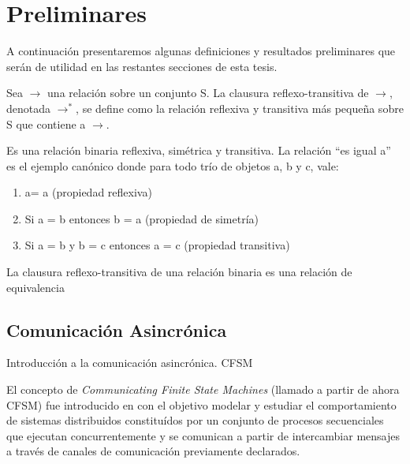 \section{Preliminares}
\label{preliminares}
A continuación presentaremos algunas definiciones y resultados preliminares que serán de utilidad en las restantes secciones de esta tesis.

\begin{definition} Sea $\rightarrow$ una relación sobre un conjunto S. La clausura reflexo-transitiva de $\rightarrow$, denotada  $\rightarrow^*$, se define como la relación reflexiva y transitiva más pequeña sobre S que contiene a $\rightarrow$. 
\end{definition} 
\begin{definition} Es una relación binaria reflexiva, simétrica y transitiva. La relación ``es igual a''  es el ejemplo canónico donde para todo trío de objetos a, b y c, vale: 

\begin{enumerate}
    \item a= a (propiedad reflexiva)
    \item Si a = b entonces b = a (propiedad de simetría)
    \item Si a = b y b = c entonces a = c (propiedad transitiva)
\end{enumerate}
\end{definition}

\begin{prop}
 La clausura reflexo-transitiva de una relación binaria es una relación de equivalencia
\end{prop}

\subsection{Comunicación Asincrónica}
Introducción a la comunicación asincrónica. CFSM



El concepto de \emph{Communicating Finite State Machines} (llamado a partir de ahora CFSM) fue introducido en \cite{CFSM} con el objetivo modelar y estudiar el comportamiento de sistemas distribuidos constituídos por un conjunto de procesos secuenciales que ejecutan concurrentemente y se comunican a partir de intercambiar mensajes a través de canales de comunicación previamente declarados.

